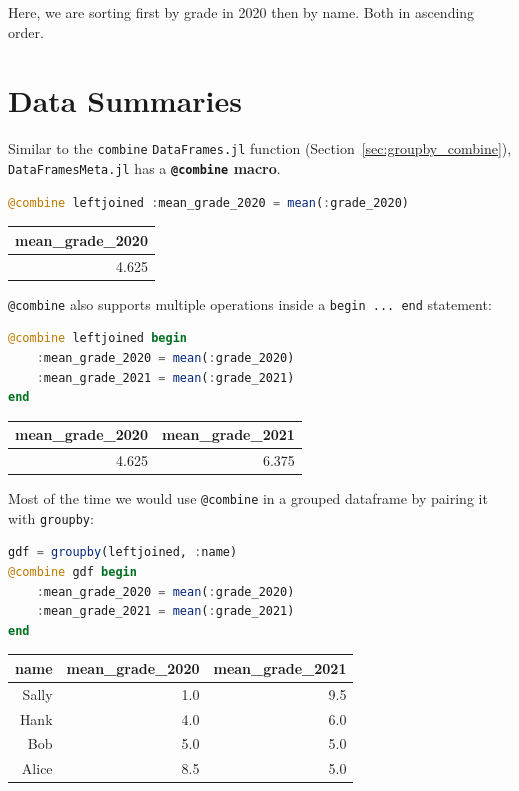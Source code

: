 \documentclass[
  notoc %
]{tufte-book}
\newcommand{\passthrough}[1]{#1}
\begin{document}
Here, we are sorting first by grade in 2020 then by name. Both in
ascending order.

\hypertarget{sec:dataframesmeta_combine}{%
\section{Data Summaries}\label{sec:dataframesmeta_combine}}

Similar to the \passthrough{\lstinline!combine!}
\passthrough{\lstinline!DataFrames.jl!} function
(Section~\ref{sec:groupby_combine}),
\passthrough{\lstinline!DataFramesMeta.jl!} has a
\textbf{\passthrough{\lstinline!@combine!} macro}.

\begin{lstlisting}[language=Julia]
@combine leftjoined :mean_grade_2020 = mean(:grade_2020)
\end{lstlisting}

\begin{longtable}[]{@{}r@{}}
\toprule
mean\_grade\_2020 \\
\midrule
\endhead
4.625 \\
\bottomrule
\end{longtable}

\passthrough{\lstinline!@combine!} also supports multiple operations
inside a \passthrough{\lstinline!begin ... end!} statement:

\begin{lstlisting}[language=Julia]
@combine leftjoined begin
    :mean_grade_2020 = mean(:grade_2020)
    :mean_grade_2021 = mean(:grade_2021)
end
\end{lstlisting}

\begin{longtable}[]{@{}rr@{}}
\toprule
mean\_grade\_2020 & mean\_grade\_2021 \\
\midrule
\endhead
4.625 & 6.375 \\
\bottomrule
\end{longtable}

Most of the time we would use \passthrough{\lstinline!@combine!} in a
grouped dataframe by pairing it with \passthrough{\lstinline!groupby!}:

\begin{lstlisting}[language=Julia]
gdf = groupby(leftjoined, :name)
@combine gdf begin
    :mean_grade_2020 = mean(:grade_2020)
    :mean_grade_2021 = mean(:grade_2021)
end
\end{lstlisting}

\begin{longtable}[]{@{}rrr@{}}
\toprule
name & mean\_grade\_2020 & mean\_grade\_2021 \\
\midrule
\endhead
Sally & 1.0 & 9.5 \\
Hank & 4.0 & 6.0 \\
Bob & 5.0 & 5.0 \\
Alice & 8.5 & 5.0 \\
\bottomrule
\end{longtable}
\end{document}
